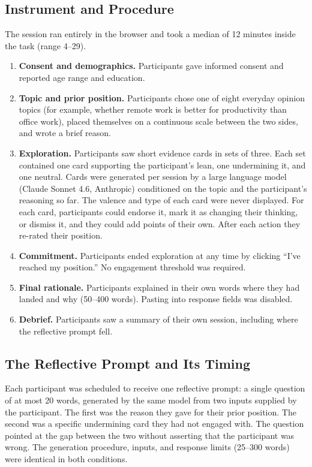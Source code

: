 \documentclass[12pt,letterpaper]{article}
\begin{document}
\subsection{Instrument and Procedure}
The session ran entirely in the browser and took a median of 12 minutes inside the task (range 4--29).
\begin{enumerate}
\item \textbf{Consent and demographics.} Participants gave informed consent and reported age range and education.
\item \textbf{Topic and prior position.} Participants chose one of eight everyday opinion topics (for example, whether remote work is better for productivity than office work), placed themselves on a continuous scale between the two sides, and wrote a brief reason.
\item \textbf{Exploration.} Participants saw short evidence cards in sets of three. Each set contained one card supporting the participant's lean, one undermining it, and one neutral. Cards were generated per session by a large language model (Claude Sonnet 4.6, Anthropic) conditioned on the topic and the participant's reasoning so far. The valence and type of each card were never displayed. For each card, participants could endorse it, mark it as changing their thinking, or dismiss it, and they could add points of their own. After each action they re-rated their position.
\item \textbf{Commitment.} Participants ended exploration at any time by clicking ``I've reached my position.'' No engagement threshold was required.
\item \textbf{Final rationale.} Participants explained in their own words where they had landed and why (50--400 words). Pasting into response fields was disabled.
\item \textbf{Debrief.} Participants saw a summary of their own session, including where the reflective prompt fell.
\end{enumerate}

\subsection{The Reflective Prompt and Its Timing}
Each participant was scheduled to receive one reflective prompt: a single question of at most 20 words, generated by the same model from two inputs supplied by the participant. The first was the reason they gave for their prior position. The second was a specific undermining card they had not engaged with. The question pointed at the gap between the two without asserting that the participant was wrong. The generation procedure, inputs, and response limits (25--300 words) were identical in both conditions.
\end{document}
